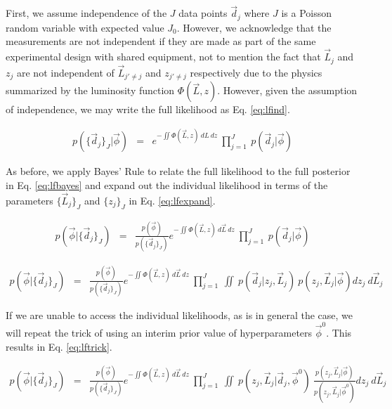 \documentclass[preprint]{aastex}
\begin{document}
First, we assume independence of the $J$ data points $\vec{d}_{j}$ where $J$ is 
a Poisson random variable with expected value $J_{0}$.  However, we acknowledge 
that the measurements are not independent if they are made as part of the same 
experimental design with shared equipment, not to mention the fact that 
$\vec{L}_{j}$ and $z_{j}$ are not independent of $\vec{L}_{j'\neq j}$ and 
$z_{j'\neq j}$ respectively due to the physics summarized by the luminosity 
function $\Phi(\vec{L},z)$.  However, given the assumption of independence, we 
may write the full likelihood as Eq. \ref{eq:lfind}.  

\begin{eqnarray}
\label{eq:lfind}
p(\{\vec{d}_{j}\}_{J}|\vec{\phi}) &=& e^{-\iint \Phi(\vec{L},z)\ dL\ dz}\ 
\prod_{j=1}^{J}\ p(\vec{d}_{j}|\vec{\phi})
\end{eqnarray}

As before, we apply Bayes' Rule to relate the full likelihood to the full 
posterior in Eq. \ref{eq:lfbayes} and expand out the individual likelihood in 
terms of the parameters $\{\vec{L}_{j}\}_{J}$ and $\{z_{j}\}_{J}$ in Eq. 
\ref{eq:lfexpand}.

\begin{eqnarray}
\label{eq:lfbayes}
p(\vec{\phi}|\{\vec{d}_{j}\}_{J}) &=& 
\frac{p(\vec{\phi})}{p(\{\vec{d}_{j}\}_{J})}e^{-\iint \Phi(\vec{L},z)\ 
d\vec{L}\ dz}\ \prod_{j=1}^{J}\ p(\vec{d}_{j}|\vec{\phi})
\end{eqnarray}

\begin{eqnarray}
\label{eq:lfexpand}
p(\vec{\phi}|\{\vec{d}_{j}\}_{J}) &=& 
\frac{p(\vec{\phi})}{p(\{\vec{d}_{j}\}_{J})}e^{-\iint \Phi(\vec{L},z)\ 
d\vec{L}\ dz}\ \prod_{j=1}^{J}\ \iint\ p(\vec{d}_{j}|z_{j},\vec{L}_{j})\ 
p(z_{j},\vec{L}_{j}|\vec{\phi}) dz_{j}\ d\vec{L}_{j}
\end{eqnarray}

If we are unable to access the individual likelihoods, as is in general the 
case, we will repeat the trick of using an interim prior value of 
hyperparameters $\vec{\phi}^{0}$.  This results in Eq. \ref{eq:lftrick}.

\begin{eqnarray}
\label{eq:lftrick}
p(\vec{\phi}|\{\vec{d}_{j}\}_{J}) &=& 
\frac{p(\vec{\phi})}{p(\{\vec{d}_{j}\}_{J})}e^{-\iint \Phi(\vec{L},z)\ 
d\vec{L}\ dz}\ \prod_{j=1}^{J}\ \iint\ 
p(z_{j},\vec{L}_{j}|\vec{d}_{j},\vec{\phi}^{0})\ 
\frac{p(z_{j},\vec{L}_{j}|\vec{\phi})}{p(z_{j},\vec{L}_{j}|\vec{\phi}^{0})} 
dz_{j}\ d\vec{L}_{j}
\end{eqnarray}
\end{document}
